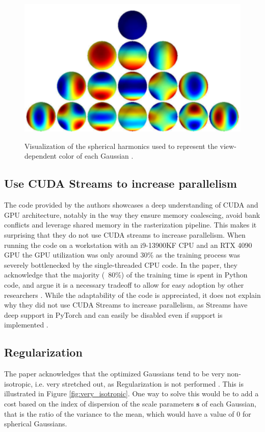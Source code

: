\begin{figure}
    \centering
    \includegraphics[width=\linewidth]{images/spherical_harmonics.png}
    \label{fig:spherical_harmonics}
    \caption{Visualization of the spherical harmonics used to represent the view-dependent color of each Gaussian \cite{pokorny2014a}.}
\end{figure}

\subsection{Use CUDA Streams to increase parallelism}
The code provided by the authors showcases a deep understanding of CUDA and GPU architecture,
notably in the way they ensure memory coalescing, avoid bank conflicts and leverage shared memory in the rasterization pipeline.
This makes it surprising that they do not use CUDA streams to increase parallelism.
When running the code on a workstation with an i9-13900KF CPU and an RTX 4090 GPU the GPU utilization was only around 30\% as the training process was severely bottlenecked by the single-threaded CPU code.
In the paper, they acknowledge that the majority (~80\%) of the training time is spent in Python code, and argue it is a necessary tradeoff to allow for easy adoption by other researchers \cite[Sec. 8]{kerbl3DGaussianSplatting2023}.
While the adaptability of the code is appreciated, it does not explain why they did not use CUDA Streams to increase parallelism, as Streams have deep support in PyTorch and can easily be disabled even if support is implemented \cite{pytorchcontributorsCUDASemanticsPyTorch2023}.

\subsection{Regularization}
The paper acknowledges that the optimized Gaussians tend to be very non-isotropic, i.e. very stretched out, as  Regularization is not performed \cite[Sec. 7.4]{kerbl3DGaussianSplatting2023}.
This is illustrated in Figure \ref{fig:very_isotropic}.
One way to solve this would be to add a cost based on the index of dispersion of the scale parameters $\bm{s}$ of each Gaussian, that is the ratio of the variance to the mean, which would have a value of 0 for spherical Gaussians.

